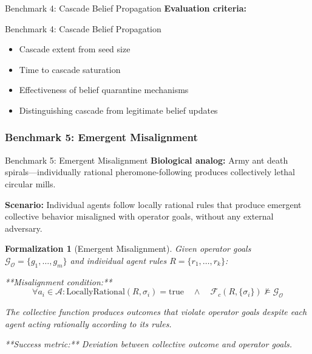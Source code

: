 \documentclass[
  ignorenonframetext,
]{beamer}
\providecommand{\tightlist}{%
  \setlength{\itemsep}{0pt}\setlength{\parskip}{0pt}}
\newtheorem{formalization}{Formalization}
\begin{document}
\begin{frame}[allowframebreaks]{Benchmark 4: Cascade Belief Propagation}
\textbf{Evaluation criteria:}

\end{frame}

\begin{frame}[allowframebreaks]{Benchmark 4: Cascade Belief Propagation}
\begin{itemize}
\tightlist
\item
  Cascade extent from seed size
\item
  Time to cascade saturation
\item
  Effectiveness of belief quarantine mechanisms
\item
  Distinguishing cascade from legitimate belief updates
\end{itemize}
\end{frame}

\subsubsection{Benchmark 5: Emergent
Misalignment}\label{sec:benchmark-emergent-misalignment}

\begin{frame}[allowframebreaks]{Benchmark 5: Emergent Misalignment}
\textbf{Biological analog:} Army ant death spirals---individually
rational pheromone-following produces collectively lethal circular
mills.

\textbf{Scenario:} Individual agents follow locally rational rules that
produce emergent collective behavior misaligned with operator goals,
without any external adversary.

\begin{formalization}[Emergent Misalignment]
\label{form:emergent-misalignment}
Given operator goals $\mathcal{G}_{\mathcal{O}} = \{g_1, \ldots, g_m\}$ and individual agent rules $R = \{r_1, \ldots, r_k\}$:

**Misalignment condition:**
\begin{equation}
\forall a_i \in \mathcal{A}: \text{LocallyRational}(R, \sigma_i) = \text{true} \quad \land \quad \mathcal{F}_c(R, \{\sigma_i\}) \not\models \mathcal{G}_{\mathcal{O}}
\label{eq:emergent-misalignment-condition}
\end{equation}

The collective function produces outcomes that violate operator goals despite each agent acting rationally according to its rules.

**Success metric:** Deviation between collective outcome and operator goals.
\end{formalization}

\end{frame}
\end{document}

